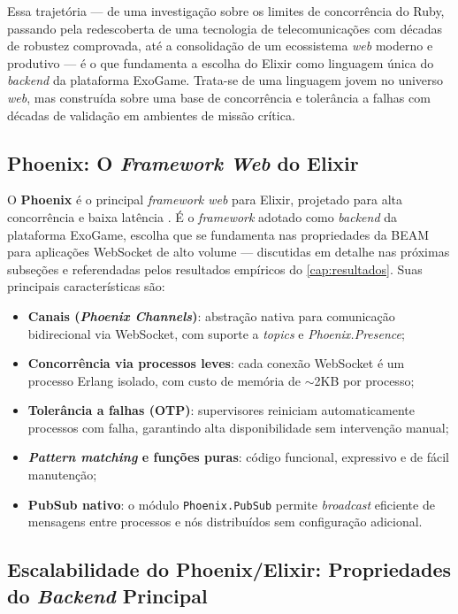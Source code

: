 \documentclass[
	12pt,
	openany,
	oneside,
	a4paper,
	english,
	brazil
]{abntex2}
\begin{document}
Essa trajetória --- de uma investigação sobre os limites de concorrência do Ruby, passando pela redescoberta de uma tecnologia de telecomunicações com décadas de robustez comprovada, até a consolidação de um ecossistema \textit{web} moderno e produtivo --- é o que fundamenta a escolha do Elixir como linguagem única do \textit{backend} da plataforma ExoGame. Trata-se de uma linguagem jovem no universo \textit{web}, mas construída sobre uma base de concorrência e tolerância a falhas com décadas de validação em ambientes de missão crítica.

\subsection{Phoenix: O \textit{Framework Web} do Elixir}

O \textbf{Phoenix} é o principal \textit{framework web} para Elixir, projetado para alta concorrência e baixa latência \cite{phoenix2024}. É o \textit{framework} adotado como \textit{backend} da plataforma ExoGame, escolha que se fundamenta nas propriedades da BEAM para aplicações WebSocket de alto volume --- discutidas em detalhe nas próximas subseções e referendadas pelos resultados empíricos do \autoref{cap:resultados}. Suas principais características são:

\begin{itemize}
  \item \textbf{Canais (\textit{Phoenix Channels})}: abstração nativa para comunicação bidirecional via WebSocket, com suporte a \textit{topics} e \textit{Phoenix.Presence};
  \item \textbf{Concorrência via processos leves}: cada conexão WebSocket é um processo Erlang isolado, com custo de memória de $\sim$2KB por processo;
  \item \textbf{Tolerância a falhas (OTP)}: supervisores reiniciam automaticamente processos com falha, garantindo alta disponibilidade sem intervenção manual;
  \item \textbf{\textit{Pattern matching} e funções puras}: código funcional, expressivo e de fácil manutenção;
  \item \textbf{PubSub nativo}: o módulo \texttt{Phoenix.PubSub} permite \textit{broadcast} eficiente de mensagens entre processos e nós distribuídos sem configuração adicional.
\end{itemize}

\subsection{Escalabilidade do Phoenix/Elixir: Propriedades do \textit{Backend} Principal}\label{sec:escalabilidade}
\end{document}
